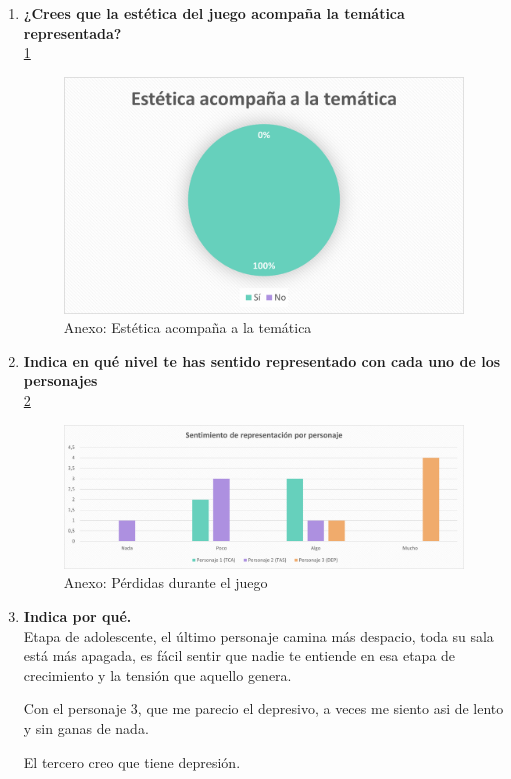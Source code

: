 \documentclass[12pt, a4paper,twoside,titlepage]{book}
\begin{document}
\begin{enumerate}[label=\textbf{\arabic*}.]
		
	 \item \textbf{¿Crees que la estética del juego acompaña la temática representada?}\\
	 \ref{fig:anexEstetic}
	\begin{figure}
		\centering
		\includegraphics[width=.8\linewidth]{Anexo Demo/7AnexDemo_estetic}
		\caption{Anexo: Estética acompaña a la temática}
		\label{fig:anexEstetic}
	\end{figure}
	
	 \item \textbf{Indica en qué nivel te has sentido representado con cada uno de los personajes}\\
	  \ref{fig:anexRepre}
	 \begin{figure}
	 	\centering
	 	\includegraphics[width=.8\linewidth]{Anexo Demo/8AnexDemo_repres}
	 	\caption{Anexo: Pérdidas durante el juego}
	 	\label{fig:anexRepre}
	 \end{figure}
	 
	 \item \textbf{Indica por qué.}\\	 
		 Etapa de adolescente, el último personaje camina más despacio, toda su sala está más apagada, es fácil sentir que nadie te entiende en esa etapa de crecimiento y la tensión que aquello genera.
		 
		 Con el personaje 3, que me parecio el depresivo, a veces me siento asi de lento y sin ganas de nada.
		 
		 El tercero creo que tiene depresión.
		 

\end{enumerate}
\end{document}
